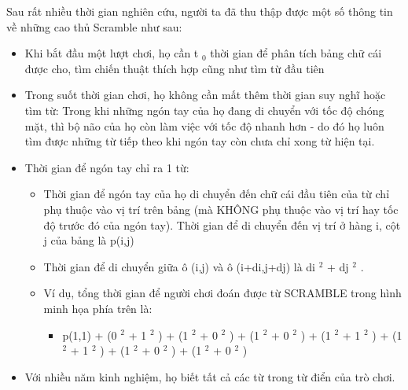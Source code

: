Sau rất nhiều thời gian nghiên cứu, người ta đã thu thập được một số thông tin về những cao thủ Scramble như sau:
\begin{itemize}
	\item Khi bắt đầu một lượt chơi, họ cần t $_ 0 $ thời gian để phân tích bảng chữ cái được cho, tìm chiến thuật thích hợp cũng như tìm từ đầu tiên
	\item Trong suốt thời gian chơi, họ không cần mất thêm thời gian suy nghĩ hoặc tìm từ: Trong khi những ngón tay của họ đang di chuyển với tốc độ chóng mặt, thì bộ não của họ còn làm việc với tốc độ nhanh hơn - do đó họ luôn tìm được những từ tiếp theo khi ngón tay còn chưa chỉ xong từ hiện tại.
	\item Thời gian để ngón tay chỉ ra 1 từ:
\begin{itemize}
	\item Thời gian để ngón tay của họ di chuyển đến chữ cái đầu tiên của từ chỉ phụ thuộc vào vị trí trên bảng (mà KHÔNG phụ thuộc vào vị trí hay tốc độ trước đó của ngón tay). Thời gian để di chuyển đến vị trí ở hàng i, cột j của bảng là p(i,j)
	\item Thời gian để di chuyển giữa ô (i,j) và ô (i+di,j+dj) là di $^ 2 $ + dj $^ 2 $ .
	\item Ví dụ, tổng thời gian để người chơi đoán được từ SCRAMBLE trong hình minh họa phía trên là:
\begin{itemize}
	\item p(1,1) + (0 $^ 2 $ + 1 $^ 2 $ ) + (1 $^ 2 $ + 0 $^ 2 $ ) + (1 $^ 2 $ + 0 $^ 2 $ ) + (1 $^ 2 $ + 1 $^ 2 $ ) + (1 $^ 2 $ + 1 $^ 2 $ ) + (1 $^ 2 $ + 0 $^ 2 $ ) + (1 $^ 2 $ + 0 $^ 2 $ )
\end{itemize}
\end{itemize}
	\item Với nhiều năm kinh nghiệm, họ biết tất cả các từ trong từ điển của trò chơi.
\end{itemize}

